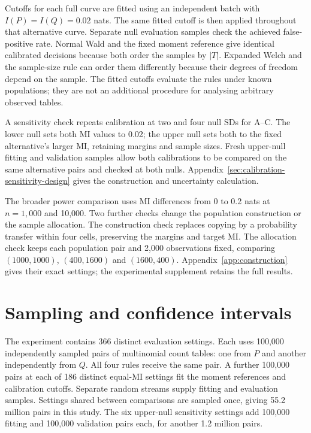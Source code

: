 Cutoffs for each full curve are fitted using an independent batch with
\(I(P)=I(Q)=0.02\) nats. The same fitted cutoff is then applied
throughout that alternative curve. Separate null evaluation samples
check the achieved false-positive rate. Normal Wald and the fixed
moment reference give identical calibrated decisions because both order
the samples by \(|T|\). Expanded Welch and the sample-size rule can
order them differently because their degrees of freedom depend on the
sample. The fitted cutoffs evaluate the rules under known populations;
they are not an additional procedure for analysing arbitrary observed
tables.

A sensitivity check repeats calibration at two and four null SDs for
A--C. The lower null sets both MI values to 0.02; the upper null sets
both to the fixed alternative's larger MI, retaining margins and sample
sizes. Fresh upper-null fitting and validation samples allow both
calibrations to be compared on the same alternative pairs and checked
at both nulls. Appendix~\ref{sec:calibration-sensitivity-design} gives
the construction and uncertainty calculation.

The broader power comparison uses MI differences from 0 to 0.2 nats at
\(n=1{,}000\) and 10,000. Two further checks change the population
construction or the sample allocation. The construction check replaces
copying by a probability transfer within four cells, preserving the
margins and target MI. The allocation check keeps each population pair
and 2,000 observations fixed, comparing \((1000,1000)\), \((400,1600)\)
and \((1600,400)\). Appendix~\ref{app:construction} gives their exact
settings; the experimental supplement retains the full results.

\section{Sampling and confidence intervals}

The experiment contains 366 distinct evaluation settings. Each uses
100,000 independently sampled pairs of multinomial count tables: one
from \(P\) and another independently from \(Q\). All four rules receive
the same pair. A further 100,000 pairs at each of 186 distinct equal-MI
settings fit the moment references and calibration cutoffs. Separate
random streams supply fitting and evaluation samples. Settings shared
between comparisons are sampled once, giving 55.2 million pairs in this
study. The six upper-null sensitivity settings add 100,000 fitting and
100,000 validation pairs each, for another 1.2 million pairs.

